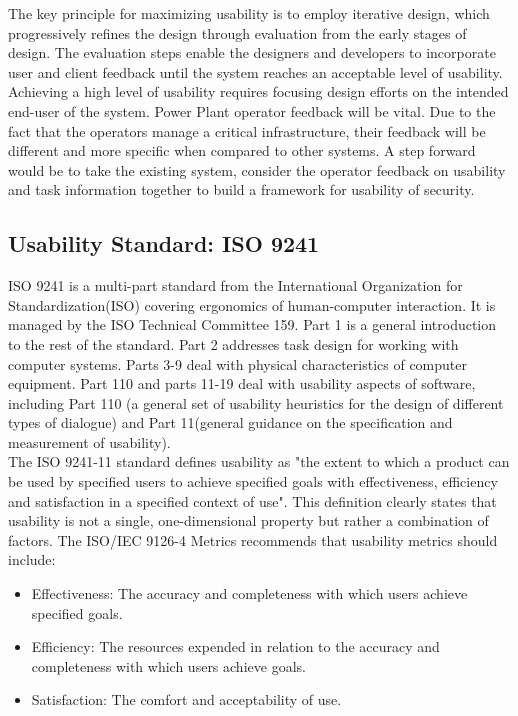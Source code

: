 \smallskip

The key principle for maximizing usability is to employ iterative design, which progressively refines the design through evaluation from the early stages of design. The evaluation steps enable the designers and developers to incorporate user and client feedback until the system reaches an acceptable level of usability. Achieving a high level of usability requires focusing design efforts on the intended end-user of the system. Power Plant operator feedback will be vital. Due to the fact that the operators manage a critical infrastructure, their feedback will be different and more specific when compared to other systems. A step forward would be to take the existing system, consider the operator feedback on usability and task information together to build a framework for usability of security.

\subsection{Usability Standard: ISO 9241}

ISO 9241 is a multi-part standard from the International Organization for Standardization(ISO) covering ergonomics of human-computer interaction. It is managed by the ISO Technical Committee 159. Part 1 is a general introduction to the rest of the standard. Part 2 addresses task design for working with computer systems. Parts 3-9 deal with physical characteristics of computer equipment. Part 110 and parts 11-19 deal with usability aspects of software, including Part 110 (a general set of usability heuristics for the design of different types of dialogue) and Part 11(general guidance on the specification and measurement of usability). \\

The ISO 9241-11 standard defines usability as "the extent to which a product can be used
by specified users to achieve specified goals with effectiveness, efficiency and satisfaction
in a specified context of use". This definition clearly states that usability is not a single,
one-dimensional property but rather a combination of factors.
The ISO/IEC 9126-4 Metrics recommends that usability metrics should include:
\begin{itemize}
\item Effectiveness: The accuracy and completeness with which users achieve specified
goals.

\item Efficiency: The resources expended in relation to the accuracy and completeness
with which users achieve goals.

\item Satisfaction: The comfort and acceptability of use.
\end{itemize}

